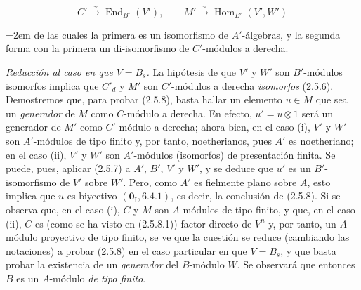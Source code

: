 \begin{env}[2.5.8.6]
\label{IV.2.5.8.6-fr}
\[
C'\xrightarrow{\sim}\operatorname{End}_{B'}(V'),\qquad
M'\xrightarrow{\sim}\operatorname{Hom}_{B'}(V',W')
\]
{\emergencystretch=2em
de las cuales la primera es un isomorfismo de $A'$-álgebras, y la segunda
forma con la primera un di-isomorfismo de $C'$-módulos a derecha.\par}
\end{env}

\begin{env}[2.5.8.7]
\label{IV.2.5.8.7-fr}
\emph{Reducción al caso en que $V=B_s$.} La hipótesis de que $V'$ y $W'$ son
$B'$-módulos isomorfos implica que $C'_d$ y $M'$ son $C'$-módulos a derecha
\emph{isomorfos} (2.5.6). Demostremos que, para probar (2.5.8), basta hallar un
elemento $u\in M$ que sea un \emph{generador} de $M$ como $C$-módulo a derecha. En
efecto, $u'=u\otimes1$ será un generador de $M'$ como $C'$-módulo a derecha;
ahora bien, en el caso (i), $V'$ y $W'$ son $A'$-módulos de tipo finito y, por
tanto, noetherianos, pues $A'$ es noetheriano; en el caso (ii), $V'$ y $W'$ son
$A'$-módulos (isomorfos) de presentación finita. Se puede, pues, aplicar (2.5.7)
a $A'$, $B'$, $V'$ y $W'$, y se deduce que $u'$ es un $B'$-isomorfismo de
$V'$ sobre $W'$. Pero, como $A'$ es fielmente plano sobre $A$, esto implica que
$u$ es biyectivo $(\mathbf{0}_{\mathrm I},6.4.1)$, es decir, la conclusión de (2.5.8).
Si se observa que, en el caso (i), $C$ y $M$ son $A$-módulos de tipo finito, y
que, en el caso (ii), $C$ es (como se ha visto en (2.5.8.1)) factor directo de
$V^n$ y, por tanto, un $A$-módulo proyectivo de tipo finito, se ve que la cuestión se reduce (cambiando las notaciones) a probar (2.5.8) en el caso particular en
que $V=B_s$, y que basta probar la existencia de un \emph{generador} del $B$-módulo
$W$. Se observará que entonces $B$ es un $A$-módulo \emph{de tipo finito}.
\end{env}


